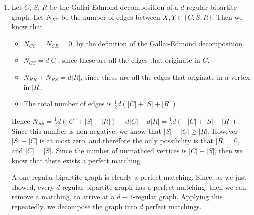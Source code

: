 \documentclass[11pt]{article} \usepackage{amssymb}
\newcommand{\half}{{\textstyle \frac12}}
\begin{document}
\begin{enumerate}
\item
  Let $C$, $S$, $R$ be the Gallai-Edmond decomposition of a $d$-regular
  bipartite graph. Let $N_{XY}$ be the number of edges between 
  $X,Y\in \{C,S,R\}$. Then we know that
  \begin{itemize}
  \item $N_{CC}=N_{CR}=0$, by the definition of the Gallai-Edmond decomposition.
  \item $N_{CS}=d|C|$, since these are all the edges that originate in $C$.
  \item $N_{RR}+N_{RS}=d|R|$, since these are all the edges that originate
    in a vertex in $|R|$.
  \item The total number of edges is $\half d(|C|+|S|+|R|)$. 
  \end{itemize}
  
  Hence $N_{SS}=\half d(|C|+|S|+|R|) - d|C|-d|R|=\half d(-|C|+|S|-|R|)$. Since this number
  is non-negative, we know that $|S|-|C|\geq |R|$. However $|S|-|C|$ is at most
  zero, and therefore the only possibility is that $|R|=0$, and $|C|=|S|$. 
  Since the number of unmathced vertices is $|C|-|S|$, then we know that there
  exists a perfect matching. 

  
  A one-regular bipartite graph is clearly a perfect matching. 
  Since, as we just showed, every $d$-regular bipartite graph has a perfect
  matching, then we can remove a matching, 
  to arrive at a $d-1$-regular graph. Applying
  this repeatedly, we decompose the graph into $d$ perfect matchings.

\end{enumerate}
\end{document}
